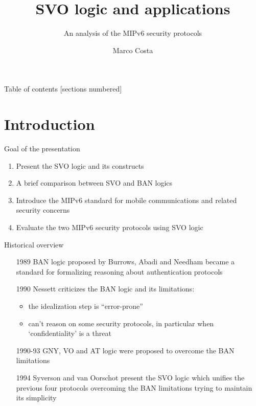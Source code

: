 \documentclass[10pt]{beamer}
\title{SVO logic and applications}
\subtitle{An analysis of the MIPv6 security protocols}
\institute{University of Pisa}
\date{}
\author{Marco Costa}
\begin{document}
\maketitle

\begin{frame}{Table of contents}
	[sections numbered]
	\tableofcontents[hideallsubsections]
	\end{frame}

\section{Introduction}
\begin{frame}{Goal of the presentation}
	\begin{enumerate}
		\item Present the SVO logic and its constructs 
		\item A brief comparison between SVO and BAN logics
		\item Introduce the MIPv6 standard for mobile communications and related security concerns
		\item Evaluate the two MIPv6 security protocols using SVO logic
	\end{enumerate}
\end{frame}
\begin{frame}{Historical overview}
	\begin{itemize}
		\item [1989] BAN logic proposed by Burrows, Abadi and Needham became a standard for formalizing reasoning about authentication protocols
		\item [1990] Nessett criticizes the BAN logic and its limitations:
		\begin{itemize}
			\item the idealization step is ``error-prone''
			\item can't reason on some security protocols, in particular when `confidentiality' is a threat
		\end{itemize}  
		\item [1990-93] GNY, VO and AT logic were proposed to overcome the BAN limitations
		\item [1994] Syverson and van Oorschot present the SVO logic which unifies the previous four protocols overcoming the BAN limitations trying to maintain its simplicity
	\end{itemize}
\end{frame}
\end{document}
